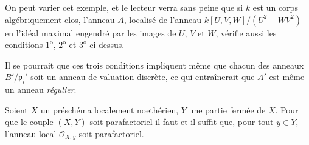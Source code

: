 \begin{env}[21.13.9]
On peut varier cet exemple, et le lecteur verra sans peine que si $k$ est un corps
algébriquement clos, l'anneau $A$, localisé de l'anneau
$k[U,V,W]/(U^2-WV^2)$ en l'idéal maximal engendré par les images de $U$, $V$ et $W$,
vérifie aussi les conditions $1^{\mathrm o}$, $2^{\mathrm o}$ et $3^{\mathrm o}$
ci-dessus.

Il se pourrait que ces trois conditions impliquent même que chacun des anneaux
$B'/\mathfrak p_i'$ soit un anneau de valuation discrète, ce qui entraînerait que
$A'$ est même un anneau \emph{régulier}.
\end{env}

\begin{proposition}[21.13.10]
\label{IV.21.13.10}
Soient $X$ un préschéma localement noethérien, $Y$ une partie fermée de $X$. Pour que
le couple $(X,Y)$ soit parafactoriel il faut et il suffit que, pour tout $y\in Y$,
l'anneau local $\mathcal O_{X,y}$ soit parafactoriel.
\end{proposition}

